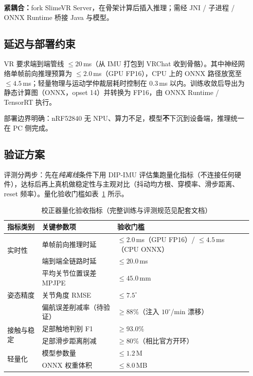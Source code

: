 \documentclass[scheme=plain,UTF8,11pt,a4paper]{ctexart}
\begin{document}
\textbf{紧耦合：}fork SlimeVR Server，在骨架计算后插入推理；需经 JNI / 子进程 / ONNX Runtime 桥接 Java 与模型。

\subsection{延迟与部署约束}

VR 要求端到端管线 $\le 20$\,ms（从 IMU 打包到 VRChat 收到骨骼）。其中神经网络单帧前向推理预算为 $\le 2.0$\,ms（GPU FP16），CPU 上的 ONNX 路径放宽至 $\le 4.5$\,ms；轻量物理与运动学仲裁层耗时控制在 $0.3$\,ms 以内。训练收敛后导出为静态计算图（ONNX，opset 14）并转换为 FP16，由 ONNX Runtime / TensorRT 执行。

部署边界明确：nRF52840 无 NPU、算力不足，模型\textbf{不}下沉到设备端，推理统一在 PC 侧完成。

\subsection{验证方案}

评测分两步：先在\emph{纯离线}条件下用 DIP-IMU 评估集跑量化指标（不连接任何硬件），达标后再上真机做稳定性与主观对比（抖动均方根、穿模率、滑步距离、reset 频率）。量化验收门槛如表~\ref{tab:kpi} 所示。

\begin{table}[H]
\centering
\small
\caption{校正器量化验收指标（完整训练与评测规范见配套文档）}
\label{tab:kpi}
\begin{tabular}{p{2.6cm}p{5.2cm}p{5.2cm}}
\toprule
\textbf{指标类别} & \textbf{关键参数项} & \textbf{验收门槛} \\
\midrule
\multirow{2}{*}{实时性}
    & 单帧前向推理时延 & $\le 2.0$\,ms（GPU FP16）/ $\le 4.5$\,ms（CPU ONNX） \\
    & 端到端全链路时延 & $\le 20.0$\,ms \\
\midrule
\multirow{3}{*}{姿态精度}
    & 平均关节位置误差 MPJPE & $\le 45.0$\,mm \\
    & 关节角度 RMSE & $\le 7.5^{\circ}$ \\
    & 偏航误差削减率（待验证） & $\ge 88\%$（注入 $10^{\circ}$/min 漂移） \\
\midrule
\multirow{2}{*}{接触与稳定}
    & 足部触地判别 F1 & $\ge 93.0\%$ \\
    & 足部滑步距离削减 & $\ge 80\%$（相比官方开环） \\
\midrule
\multirow{2}{*}{轻量化}
    & 模型参数量 & $\le 1.2$\,M \\
    & ONNX 权重体积 & $\le 8.0$\,MB \\
\bottomrule
\end{tabular}
\end{table}
\end{document}
